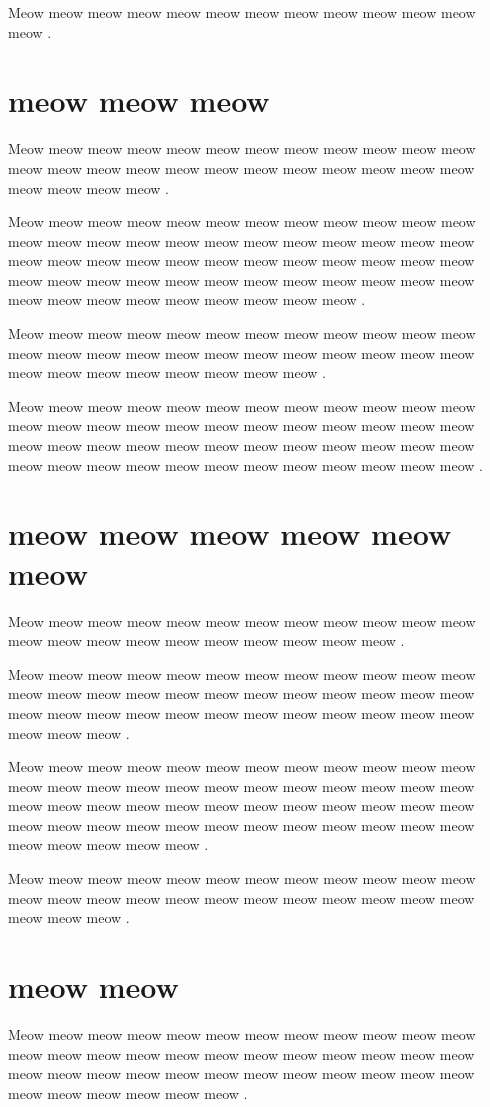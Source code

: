 \documentclass[12pt, a5paper, openany]{book}
\begin{document}
Meow meow meow meow meow meow meow meow meow meow meow meow meow .



\chapter{meow meow meow }Meow meow meow meow meow meow meow meow meow meow meow meow meow meow meow meow meow meow meow meow meow meow meow meow meow meow meow meow .

Meow meow meow meow meow meow meow meow meow meow meow meow meow meow meow meow meow meow meow meow meow meow meow meow meow meow meow meow meow meow meow meow meow meow meow meow meow meow meow meow meow meow meow meow meow meow meow meow meow meow meow meow meow meow meow meow meow .

Meow meow meow meow meow meow meow meow meow meow meow meow meow meow meow meow meow meow meow meow meow meow meow meow meow meow meow meow meow meow meow meow .

Meow meow meow meow meow meow meow meow meow meow meow meow meow meow meow meow meow meow meow meow meow meow meow meow meow meow meow meow meow meow meow meow meow meow meow meow meow meow meow meow meow meow meow meow meow meow meow meow .



\chapter{meow meow meow meow meow meow }Meow meow meow meow meow meow meow meow meow meow meow meow meow meow meow meow meow meow meow meow meow meow .

Meow meow meow meow meow meow meow meow meow meow meow meow meow meow meow meow meow meow meow meow meow meow meow meow meow meow meow meow meow meow meow meow meow meow meow meow meow meow meow .

Meow meow meow meow meow meow meow meow meow meow meow meow meow meow meow meow meow meow meow meow meow meow meow meow meow meow meow meow meow meow meow meow meow meow meow meow meow meow meow meow meow meow meow meow meow meow meow meow meow meow meow meow meow .

Meow meow meow meow meow meow meow meow meow meow meow meow meow meow meow meow meow meow meow meow meow meow meow meow meow meow meow .



\chapter{meow meow }Meow meow meow meow meow meow meow meow meow meow meow meow meow meow meow meow meow meow meow meow meow meow meow meow meow meow meow meow meow meow meow meow meow meow meow meow meow meow meow meow meow meow .
\end{document}
